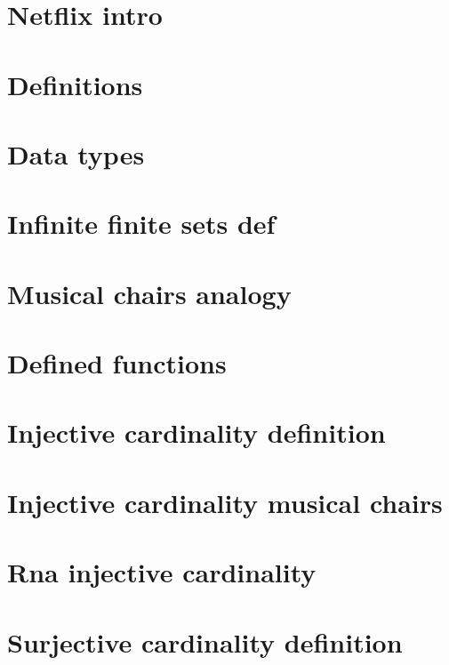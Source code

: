 
\section*{Netflix intro}

\vfill
\section*{Definitions}

\vfill
\section*{Data types}

\vfill
\section*{Infinite finite sets def}

\vfill
\section*{Musical chairs analogy}

\vfill
\section*{Defined functions}

\vfill
\section*{Injective cardinality definition}

\vfill
\section*{Injective cardinality musical chairs}

\vfill
\section*{Rna injective cardinality}

\vfill
\section*{Surjective cardinality definition}

\vfill
